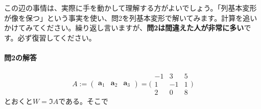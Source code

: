 この辺の事情は、実際に手を動かして理解する方がよいでしょう。「列基本変形が像を保つ」という事実を使い、問2を列基本変形で解いてみます。計算を追いかけてみてください。繰り返し言いますが、\textbf{問2は間違えた人が非常に多い}です。必ず復習してください。

\paragraph{問2の解答}
\[
A := 
\begin{pmatrix}
\bm{a}_1 & \bm{a}_2 & \bm{a}_3
\end{pmatrix}
=
\Biggl(
\begin{array}{rrr}
-1 & 3 & 5 \\
1 & -1 & 1 \\
2 & 0 & 8
\end{array}
\Biggr)
\]
とおくと$W = \Im A$である。そこで

